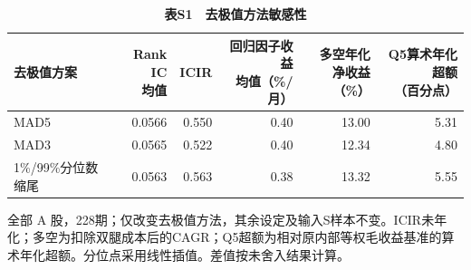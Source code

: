 \begingroup\small\setlength{\tabcolsep}{3pt}
\begin{table}[H]\centering
\caption*{\textbf{表S1　去极值方法敏感性}}
\begin{tabular*}{\textwidth}{@{\extracolsep{\fill}}lrrrrr@{}}\toprule
去极值方案 & \makecell{Rank IC\\均值} & ICIR & \makecell{回归因子收益\\均值（\%/月）} & \makecell{多空年化\\净收益（\%）} & \makecell{Q5算术年化超额\\（百分点）} \\ \midrule
MAD5 & 0.0566 & 0.550 & 0.40 & 13.00 & 5.31 \\
MAD3 & 0.0565 & 0.522 & 0.40 & 12.34 & 4.80 \\
1\%/99\%分位数缩尾 & 0.0563 & 0.563 & 0.38 & 13.32 & 5.55 \\
\bottomrule\end{tabular*}
\par\smallskip\raggedright\footnotesize 全部 A 股，228期；仅改变去极值方法，其余设定及输入S样本不变。ICIR未年化；多空为扣除双腿成本后的CAGR；Q5超额为相对原内部等权毛收益基准的算术年化超额。分位点采用线性插值。差值按未舍入结果计算。
\end{table}
\endgroup

